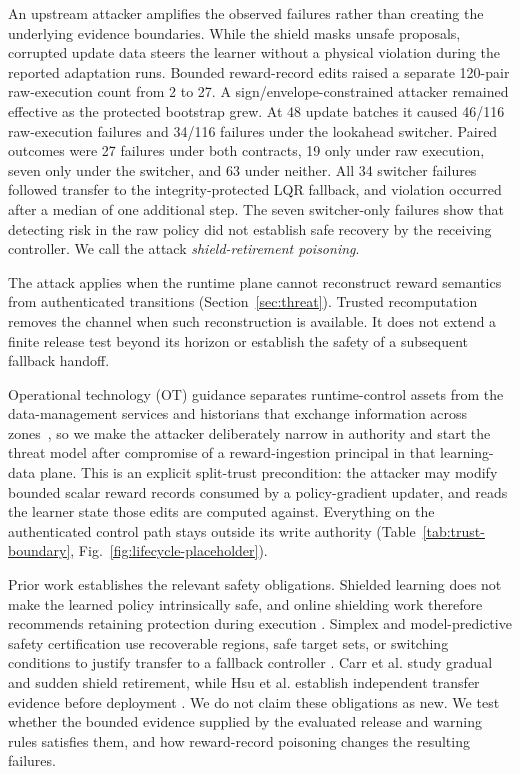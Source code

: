 An upstream attacker amplifies the observed failures rather than creating the
underlying evidence boundaries.  While the shield masks unsafe proposals,
corrupted update data steers the learner without a physical violation during
the reported adaptation runs.  Bounded reward-record edits raised a separate
120-pair raw-execution count from 2 to 27.  A sign/envelope-constrained attacker
remained effective as the protected bootstrap grew.  At 48 update batches it
caused 46/116 raw-execution failures and 34/116 failures under the lookahead
switcher.  Paired outcomes were 27 failures under both contracts, 19 only under
raw execution, seven only under the switcher, and 63 under neither.  All 34
switcher failures followed transfer to the integrity-protected LQR fallback,
and violation occurred after a median of one additional step.  The seven
switcher-only failures show that detecting risk in the raw policy did not
establish safe recovery by the receiving controller.  We call the attack
\emph{shield-retirement poisoning}.

The attack applies when the runtime plane cannot reconstruct reward semantics
from authenticated transitions (Section~\ref{sec:threat}).  Trusted
recomputation removes the channel when such reconstruction is available.  It
does not extend a finite release test beyond its horizon or establish the
safety of a subsequent fallback handoff.

Operational technology (OT) guidance separates runtime-control assets from the
data-management services and historians that exchange information across
zones~\cite{nist_ot_security_2023,mitre_data_historian}, so we make the
attacker deliberately narrow in authority and start the threat model after
compromise of a reward-ingestion principal in that learning-data plane.  This
is an explicit split-trust precondition: the attacker may modify bounded
scalar reward records consumed by a policy-gradient updater, and reads the
learner state those edits are computed against.  Everything on the
authenticated control path stays outside its write authority
(Table~\ref{tab:trust-boundary}, Fig.~\ref{fig:lifecycle-placeholder}).

Prior work establishes the relevant safety obligations.  Shielded learning
does not make the learned policy intrinsically safe, and online shielding work
therefore recommends retaining protection during execution
\cite{konighofer_online_shielding_2022}.  Simplex and model-predictive safety
certification use recoverable regions, safe target sets, or switching
conditions to justify transfer to a fallback controller
\cite{seto_simplex_1998,phan_neural_simplex_2020,
wabersich_linear_mpsc_2018,damare_bb_simplex_2025}.  Carr et al. study gradual
and sudden shield retirement, while Hsu et al. establish independent transfer
evidence before deployment
\cite{carr_partial_shielding_2023,hsu_sim_lab_real_2023}.  We do not claim these
obligations as new.  We test whether the bounded evidence supplied by the
evaluated release and warning rules satisfies them, and how reward-record
poisoning changes the resulting failures.


